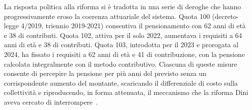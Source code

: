 La risposta politica alla riforma si è tradotta in una serie di deroghe che hanno progressivamente eroso la coerenza attuariale del sistema. Quota 100 (decreto-legge 4/2019, triennio 2019-2021) consentiva il pensionamento con 62 anni di età e 38 di contributi. Quota 102, attiva per il solo 2022, aumentava i requisiti a 64 anni di età e 38 di contributi. Quota 103, introdotta per il 2023 e prorogata al 2024, ha fissato i requisiti a 62 anni di età e 41 di contribuzione, con la pensione calcolata integralmente con il metodo contributivo. Ciascuna di queste misure consente di percepire la pensione per più anni del previsto senza un corrispondente aumento del montante, scaricando il differenziale di costo sulla collettività e riproducendo, in forma attenuata, il meccanismo che la riforma Dini aveva cercato di interrompere~\cite{LavoceRiformaDini, MEF_RGS2025}.